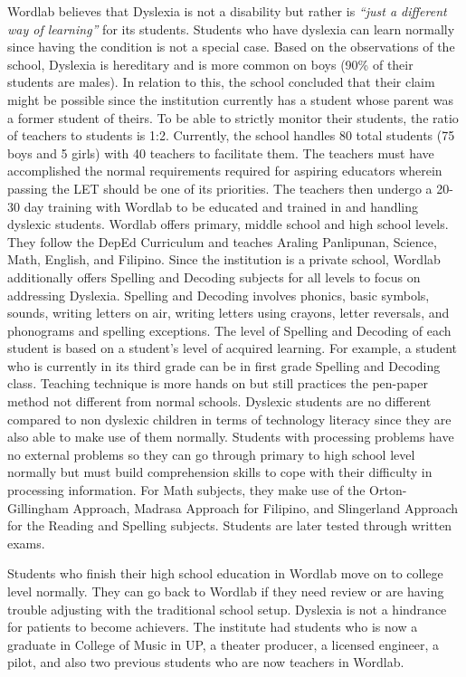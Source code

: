 \documentclass[letterpaper, 12pt, oneside]{book}
\begin{document}
Wordlab believes that Dyslexia is not a disability but rather is \textit{“just a different way of learning”} for its students. Students who have dyslexia can learn normally since having the condition is not a special case. Based on the observations of the school, Dyslexia is hereditary and is more common on boys (90\% of their students are males). In relation to this, the school concluded that their claim might be possible since the institution currently has a student whose parent was a former student of theirs. To be able to strictly monitor their students, the ratio of teachers to students is 1:2. Currently, the school handles 80 total students (75 boys and 5 girls) with 40 teachers to facilitate them. The teachers must have accomplished the normal requirements required for aspiring educators wherein passing the LET should be one of its priorities. The teachers then undergo a 20-30 day training with Wordlab to be educated and trained in and handling dyslexic students. Wordlab offers primary, middle school and high school levels. They follow the DepEd Curriculum and teaches Araling Panlipunan, Science, Math, English, and Filipino. Since the institution is a private school, Wordlab additionally offers Spelling and Decoding subjects for all levels to focus on addressing Dyslexia. Spelling and Decoding involves phonics, basic symbols, sounds, writing letters on air, writing letters using crayons, letter reversals, and phonograms and spelling exceptions. The level of Spelling and Decoding of each student is based on a student’s level of acquired learning. For example, a student who is currently in its third grade can be in first grade Spelling and Decoding class. Teaching technique is more hands on but still practices the pen-paper method not different from normal schools. Dyslexic students are no different compared to non dyslexic children in terms of technology literacy since they are also able to make use of them normally. Students with processing problems have no external problems so they can go through primary to high school level normally but must build comprehension skills to cope with their difficulty in processing information. For Math subjects, they make use of the Orton-Gillingham Approach, Madrasa Approach for Filipino, and Slingerland Approach for the Reading and Spelling subjects. Students are later tested through written exams. \newline

Students who finish their high school education in Wordlab move on to college level normally. They can go back to Wordlab if they need review or are having trouble adjusting with the traditional school setup. Dyslexia is not a hindrance for patients to become achievers. The institute had students who is now a graduate in College of Music in UP, a theater producer, a licensed engineer, a pilot, and also two previous students who are now teachers in Wordlab.\newline
\end{document}
